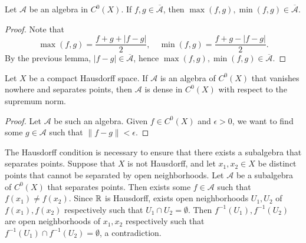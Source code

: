\begin{lm}
    Let $\mathcal A$ be an algebra in $C^0(X)$. If $f, g \in \overline{\mathcal A}$, then $\max(f, g), \min(f, g) \in \overline{\mathcal A}$.
    \begin{proof}
        Note that
        \[
        \max(f, g) = \frac{f + g + |f - g|}{2}, \quad \min(f, g) = \frac{f + g - |f - g|}{2}.
        \]
        By the previous lemma, $|f - g| \in \overline{\mathcal A}$, hence $\max(f, g), \min(f, g) \in \overline{\mathcal A}$.
    \end{proof}
\end{lm}

\begin{thm}
    Let $X$ be a compact Hausdorff space. If $\mathcal A$ is an algebra of $C^0(X)$ that vanishes nowhere and separates points, then $\mathcal A$ is dense in $C^0(X)$ with respect to the supremum norm.
    \begin{proof}
        Let $\mathcal A$ be such an algebra. Given $f \in C^0(X)$ and $\epsilon > 0$, we want to find some $g \in \mathcal A$ such that $\|f - g\| < \epsilon$.
    \end{proof}
\end{thm}

\begin{rmk}
    The Hausdorff condition is necessary to ensure that there exists a subalgebra that separates points. Suppose that $X$ is not Hausdorff, and let $x_1, x_2 \in X$ be distinct points that cannot be separated by open neighborhoods. Let $\mathcal A$ be a subalgebra of $C^0(X)$ that separates points. Then exists some $f \in \mathcal A$ such that $f(x_1) \neq f(x_2)$. Since ${\mathbb R}$ is Hausdorff, exists open neighborhoods $U_1, U_2$ of $f(x_1), f(x_2)$ respectively such that $U_1 \cap U_2 = \emptyset$. Then $f^{-1}(U_1), f^{-1}(U_2)$ are open neighborhoods of $x_1, x_2$ respectively such that $f^{-1}(U_1) \cap f^{-1}(U_2) = \emptyset$, a contradiction.
\end{rmk}